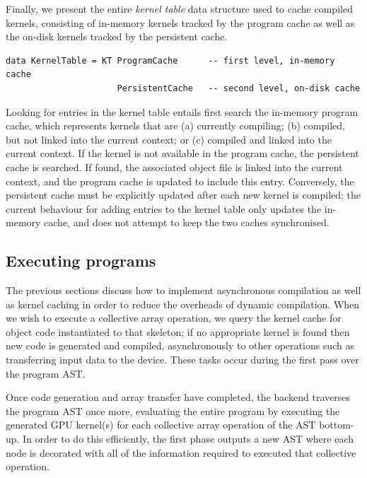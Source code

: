 Finally, we present the entire \emph{kernel table} data structure used to cache
compiled kernels, consisting of in-memory kernels tracked by the program cache
as well as the on-disk kernels tracked by the persistent cache.

\begin{lstlisting}[style=haskell]
data KernelTable = KT ProgramCache      -- first level, in-memory cache
                      PersistentCache   -- second level, on-disk cache
\end{lstlisting}

Looking for entries in the kernel table entails first search the in-memory
program cache, which represents kernels that are (a) currently compiling; (b)
compiled, but not linked into the current context; or (c) compiled and linked
into the current context. If the kernel is not available in the program cache,
the persistent cache is searched. If found, the associated object file is linked
into the current context, and the program cache is updated to include this
entry. Conversely, the persistent cache must be explicitly updated after each
new kernel is compiled; the current behaviour for adding entries to the kernel
table only updates the in-memory cache, and does not attempt to keep the two
caches synchronised.


\subsection{Executing programs}
\label{sec:executing_programs}

The previous sections discuss how to implement asynchronous compilation as well
as kernel caching in order to reduce the overheads of dynamic compilation. When
we wish to execute a collective array operation, we query the kernel cache for
object code instantiated to that skeleton; if no appropriate kernel is found
then new code is generated and compiled, asynchronously to other operations such
as transferring input data to the device. These tasks occur during the first
pass over the program AST.

Once code generation and array transfer have completed, the \CUDA backend
traverses the program AST once more, evaluating the entire program by executing
the generated GPU kernel(s) for each collective array operation of the AST
bottom-up. In order to do this efficiently, the first phase outputs a new AST
where each node is decorated with all of the information required to executed
that collective operation.%

